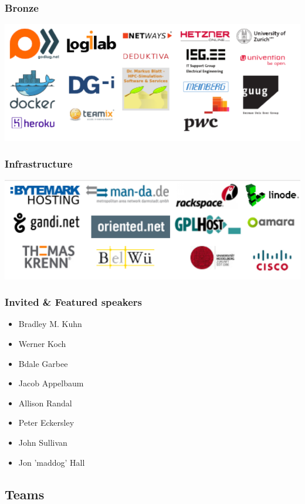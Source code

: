\documentclass[t]{beamer}
\begin{document}
\begin{frame}
	\frametitle{Bronze}
	\begin{center}
	\includegraphics[scale=0.7]{images2/sponsors/bronze2.pdf}
	\end{center}
\end{frame}

\begin{frame}
	\frametitle{Infrastructure}
	\begin{center}
	\includegraphics[scale=0.7]{images2/sponsors/infrastructure.pdf}
	\end{center}
\end{frame}

\begin{frame}
	\frametitle{Invited \& Featured speakers}
	\begin{itemize}
		\item Bradley M. Kuhn
		\item Werner Koch
		\item Bdale Garbee
		\item Jacob Appelbaum
		\item Allison Randal
		\item Peter Eckersley
		\item John Sullivan
		\item Jon 'maddog' Hall
	\end{itemize}
\end{frame}


\subsection{Teams}
\end{document}
